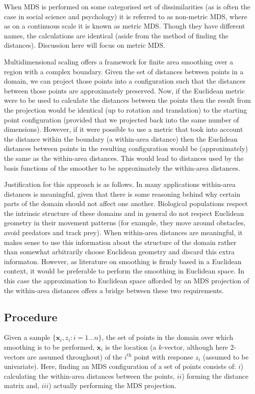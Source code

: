 When MDS is performed on some categorised set of dissimilarities (as is often the case in social science and psychology) it is referred to as non-metric MDS, where as on a continuous scale it is known as metric MDS. Though they have different names, the calculations are identical (aside from the method of finding the distances). Discussion here will focus on metric MDS.

Multidimensional scaling offers a framework for finite area smoothing over a region with a complex boundary. Given the set of distances between points in a domain, we can project those points into a configuration such that the distances between those points are approximately preserved. Now, if the Euclidean metric were to be used to calculate the distances between the points then the result from the projection would be identical (up to rotation and translation) to the starting point configuration (provided that we projected back into the same number of dimensions). However, if it were possible to use a metric that took into account the distance within the boundary (a within-area distance) then the Euclidean distances between points in the resulting configuration would be (approximately) the same as the within-area distances. This would lead to distances used by the basis functions of the smoother to be approximately the within-area distances.

Justification for this approach is as follows. In many applications within-area distances is meaningful, given that there is some reasoning behind why certain parts of the domain should not affect one another. Biological populations respect the intrinsic structure of these domains and in general do not respect Euclidean geometry in their movement patterns (for example, they move around obstacles, avoid predators and track prey). When within-area distances are meaningful, it makes sense to use this information about the structure of the domain rather than somewhat arbitrarily choose Euclidean geometry and discard this extra informaton. However, as literature on smoothing is firmly based in a Euclidean context, it would be preferable to perform the smoothing in Euclidean space. In this case the approximation to Euclidean space afforded by an MDS projection of the within-area distances offers a bridge between these two requirements.

\subsection{Procedure}
\label{mdsproc}
Given a sample $\{\bm{x}_i, z_i : i=1\dots n\}$, the set of points in the domain over which smoothing is to be performed, $\bm{x}_i$ is the location (a $k$-vector, although here 2-vectors are assumed throughout) of the $i^\text{th}$ point with response $z_i$ (assumed to be univariate). Here, finding an MDS configuration of a set of points consists of: $i$) calculating the within-area distances between the points, $ii$) forming the distance matrix and, $iii$) actually performing the MDS projection.

